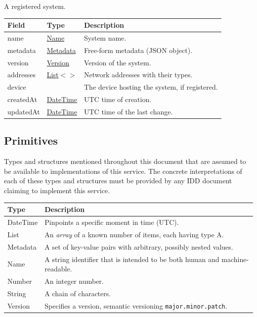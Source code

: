 \documentclass[a4paper]{arrowhead}
\newcommand{\mref}[2][]{{\textcolor{ArrowheadPurple}{\hyperref[sec:model:#2]{\ifstrempty{#1}{#2}{#1}}}}}
\newcommand{\pdef}[1]{{\textcolor{ArrowheadGrey}{#1\label{sec:model:primitives:#1}\label{sec:model:primitives:#1s}\label{sec:model:primitives:#1es}}}}
\newcommand{\pref}[1]{{\textcolor{ArrowheadGrey}{\hyperref[sec:model:primitives:#1]{#1}}}}
\begin{document}

A registered system.


\noindent\begin{tabularx}{\textwidth}{| >{\raggedright\arraybackslash}p{3.9cm} | >{\raggedright\arraybackslash\small}p{5.3cm} | X |} \hline
\rowcolor{gray!33} Field & Type & Description \\ \hline
name & \pref{Name} & System name. \\ \hline
metadata & \pref{Metadata} & Free-form metadata (JSON object). \\ \hline
version & \pref{Version} & Version of the system. \\ \hline
addresses & \pref{List}$<$\allowbreak{}\mref{Address}$>$ & Network addresses with their types. \\ \hline
device & \mref{DeviceResponse} & The device hosting the system, if registered. \\ \hline
created\allowbreak{}At & \pref{DateTime} & UTC time of creation. \\ \hline
updated\allowbreak{}At & \pref{DateTime} & UTC time of the last change. \\ \hline
\end{tabularx}



\subsection{Primitives}
\label{sec:model:primitives}

Types and structures mentioned throughout this document that are assumed to be available to implementations of this service.
The concrete interpretations of each of these types and structures must be provided by any IDD document claiming to implement this service.

\noindent\begin{tabularx}{\textwidth}{| p{4.6cm} | X |} \hline
\rowcolor{gray!33} Type & Description \\ \hline
\pdef{DateTime} & Pinpoints a specific moment in time (UTC). \\ \hline
\pdef{List} & An \textit{array} of a known number of items, each having type A. \\ \hline
\pdef{Metadata} & A set of key-value pairs with arbitrary, possibly nested values. \\ \hline
\pdef{Name} & A string identifier that is intended to be both human and machine-readable. \\ \hline
\pdef{Number} & An integer number. \\ \hline
\pdef{String} & A chain of characters. \\ \hline
\pdef{Version} & Specifies a version, semantic versioning \texttt{major.minor.patch}. \\ \hline
\end{tabularx}
\end{document}
